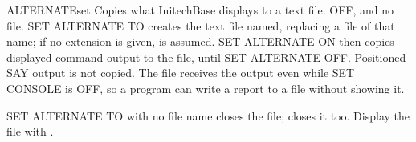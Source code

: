 \begin{XbaseEntry}{ALTERNATE}{set}
Copies what InitechBase displays to a text file.
\Syntax
{}
\Defaults
OFF, and no file.
\Usage
SET ALTERNATE TO creates the text file named, replacing a file of that name;
if no extension is given,  is assumed.  SET ALTERNATE ON then
copies displayed command output to the file, until SET ALTERNATE OFF.
Positioned  SAY output is not copied.
The file receives the output even while SET CONSOLE is OFF, so a program can
write a report to a file without showing it.

SET ALTERNATE TO with no file name closes the file;  closes it
too.  Display the file with .
\end{XbaseEntry}


